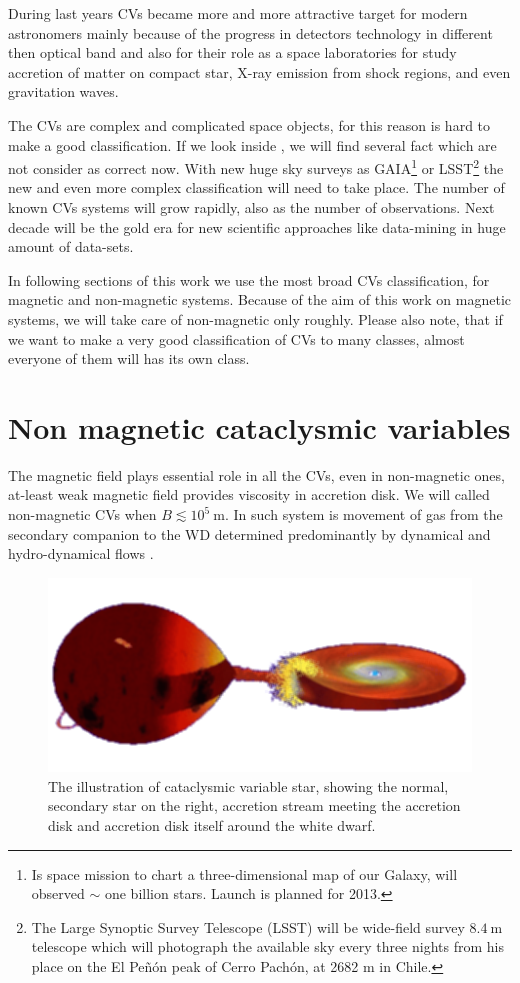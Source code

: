 \documentclass[oneside,a4paper,11pt]{report}
\begin{document}
During last years CVs became more and more attractive target for modern astronomers mainly because of  
the progress in detectors technology in different then optical band and also for their role as a 
space laboratories for study accretion of matter on compact star, X-ray emission from shock regions, 
and even gravitation waves. 

The CVs are complex and complicated space objects, for this reason is hard to make a good 
classification. If we look inside \citet{warner:1}, we will find several fact which are not 
consider as correct now. With new huge sky surveys as GAIA\footnote{Is space mission
to chart a three-dimensional map of our Galaxy, will observed $\sim$ one billion stars. Launch is planned for 2013.} 
or LSST\footnote{The Large Synoptic Survey Telescope (LSST) will be wide-field survey $8.4\: \mathrm{m}$ 
telescope which will photograph the available sky every three nights from his place on the 
El Peñón peak of Cerro Pachón, at 2682 m in Chile. } the new and even more 
complex classification will need to take place.    
The number of known CVs systems will grow rapidly, also as the number of observations. Next decade 
will be the gold era for new scientific approaches like data-mining in huge amount of data-sets.

In following sections of this work we use the most broad CVs classification, for magnetic and non-magnetic
systems. Because of the aim of this work on magnetic systems, we will take care of non-magnetic only  
roughly. Please also note, that if we want to make a very good classification of CVs to many classes, 
almost everyone of them will has its own class.  


  
\section{Non magnetic cataclysmic variables} 
The magnetic field plays essential role in all the CVs, even in non-magnetic ones, at-least weak 
magnetic field provides viscosity in accretion disk. We will called non-magnetic CVs when 
$B\lesssim10^5 \: \mathrm{m}$. 
In such system is movement of gas from the secondary companion to the WD determined predominantly 
by dynamical and hydro-dynamical flows \citet{warner:1}.

\begin{figure}[hbt]
\centering
\includegraphics[totalheight=3cm]{plot/cv}
\caption{The illustration of cataclysmic variable star, showing the normal, secondary star on the right, accretion stream meeting 
the accretion disk and accretion disk itself around the white dwarf. }
\label{cv1} 
\end{figure}
\end{document}
